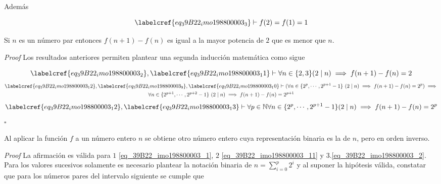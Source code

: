 Además 

\begin{equation}  \label{eq_39B22_imo198800003_11}
		\labelcref{eq_39B22_imo198800003_3} \vdash f(2) = f(1) = 1
\end{equation}

\begin{claim}
	Si $n$ es un número par entonces $f(n+1) - f(n)$ es igual a la mayor potencia de $2$ que es menor que $n$.
\end{claim}

\textit{Proof} Los resultados anteriores permiten plantear una segunda inducción matemática como sigue

\begin{equation}  \label{eq_39B22_imo198800003_12}
	\labelcref{eq_39B22_imo198800003_2}, \labelcref{eq_39B22_imo198800003_11} \vdash \forall n \in \{2,3\} (2 \mid n) \implies f(n+ 1) - f(n) = 2
\end{equation}
\begin{equation}  \label{eq_39B22_imo198800003_13}
\begin{gathered}
	\labelcref{eq_39B22_imo198800003_12}, \labelcref{eq_39B22_imo198800003_9}, \labelcref{eq_39B22_imo198800003_10} \vdash (\forall n \in \{2^p, \cdots, 2^{p+1}- 1\}\ (2 \mid n) \implies f(n+ 1) - f(n) = 2^p) \implies \\
	\forall n \in \{2^{p+1}, \cdots, 2^{p+2}-1\}\ (2 \mid n) \implies f(n+ 1) - f(n) = 2^{p+1} 
\end{gathered}	
\end{equation}
\begin{equation}  \label{eq_39B22_imo198800003_14}
	\labelcref{eq_39B22_imo198800003_12}, \labelcref{eq_39B22_imo198800003_13} \vdash \forall p \in \mathbb{N} \forall n \in \{2^p, \cdots, 2^{p+1}-1\} (2 \mid n) \implies f(n+ 1) - f(n) = 2^p
\end{equation}
\hfill $\square$

\begin{claim}
	Al aplicar la función $f$ a un número entero $n$ se obtiene otro número entero cuya representación binaria es la de $n$, pero en orden inverso.
\end{claim}
\textit{Proof} La afirmación es válida para $1$ \cref{eq_39B22_imo198800003_1}, $2$ \cref{eq_39B22_imo198800003_11} y $3$.\cref{eq_39B22_imo198800003_2}. Para los valores sucesivos solamente es necesario plantear la notación binaria de $n = \sum_{i=0}^{p}{2^i}$ y al suponer la hipótesis válida, constatar que para los números pares del intervalo siguiente se cumple que

